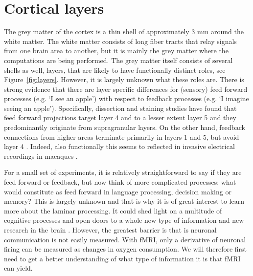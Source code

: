 \section*{Cortical layers}
The grey matter of the cortex is a thin shell of approximately 3 mm \cite{Zilles1990} around the white matter. The white matter consists of long fiber tracts that relay signals from one brain area to another, but it is mainly the grey matter where the computations are being performed. The grey matter itself consists of several shells as well, layers, that are likely to have functionally distinct roles, see Figure~\ref{fig:layers}. However, it is largely unknown what these roles are. There is strong evidence that there are layer specific differences for (sensory) feed forward processes (e.g. `I see an apple') with respect to feedback processes (e.g. `I imagine seeing an apple'). Specifically, dissection and staining studies have found that feed forward projections target layer 4 \cite{Felleman1991} and to a lesser extent layer 5 \cite{Constantinople2013} and they predominantly originate from supragranular layers. On the other hand, feedback connections from higher areas terminate primarily in layers 1 and 5, but avoid layer 4 \cite{Felleman1991,Anderson2009}. Indeed, also functionally this seems to reflected in invasive electrical recordings in macaques \cite{Buffalo2011,Maier2010,Maier2011,VanKerkoerle2017}. 


For a small set of experiments, it is relatively straightforward to say if they are feed forward or feedback, but now think of more complicated processes: what would constitute as feed forward in language processing, decision making or memory? This is largely unknown and that is why it is of great interest to learn more about the laminar processing. It could shed light on a multitude of cognitive processes and open doors to a whole new type of information and new research in the brain \cite{Lawrence2017}. However, the greatest barrier is that is neuronal communication is not easily measured. With fMRI, only a derivative of neuronal firing can be measured as changes in oxygen consumption. We will therefore first need to get a better understanding of what type of information it is that fMRI can yield.

